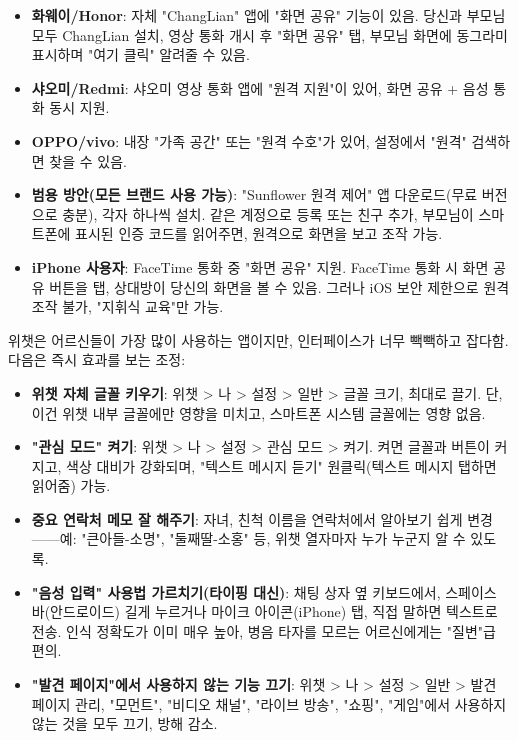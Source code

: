 \begin{itemize}
  \item \textbf{화웨이/Honor}: 자체 "ChangLian" 앱에 "화면 공유" 기능이 있음. 당신과 부모님 모두 ChangLian 설치, 영상 통화 개시 후 "화면 공유" 탭, 부모님 화면에 동그라미 표시하며 "여기 클릭" 알려줄 수 있음.
  \item \textbf{샤오미/Redmi}: 샤오미 영상 통화 앱에 "원격 지원"이 있어, 화면 공유 + 음성 통화 동시 지원.
  \item \textbf{OPPO/vivo}: 내장 "가족 공간" 또는 "원격 수호"가 있어, 설정에서 "원격" 검색하면 찾을 수 있음.
  \item \textbf{범용 방안(모든 브랜드 사용 가능)}: "Sunflower 원격 제어" 앱 다운로드(무료 버전으로 충분), 각자 하나씩 설치. 같은 계정으로 등록 또는 친구 추가, 부모님이 스마트폰에 표시된 인증 코드를 읽어주면, 원격으로 화면을 보고 조작 가능.
  \item \textbf{iPhone 사용자}: FaceTime 통화 중 "화면 공유" 지원. FaceTime 통화 시 화면 공유 버튼을 탭, 상대방이 당신의 화면을 볼 수 있음. 그러나 iOS 보안 제한으로 원격 조작 불가, "지휘식 교육"만 가능.
\end{itemize}


위챗은 어르신들이 가장 많이 사용하는 앱이지만, 인터페이스가 너무 빽빽하고 잡다함. 다음은 즉시 효과를 보는 조정:

\begin{itemize}
  \item \textbf{위챗 자체 글꼴 키우기}: 위챗 > 나 > 설정 > 일반 > 글꼴 크기, 최대로 끌기. 단, 이건 위챗 내부 글꼴에만 영향을 미치고, 스마트폰 시스템 글꼴에는 영향 없음.
  \item \textbf{"관심 모드" 켜기}: 위챗 > 나 > 설정 > 관심 모드 > 켜기. 켜면 글꼴과 버튼이 커지고, 색상 대비가 강화되며, "텍스트 메시지 듣기" 원클릭(텍스트 메시지 탭하면 읽어줌) 가능.
  \item \textbf{중요 연락처 메모 잘 해주기}: 자녀, 친척 이름을 연락처에서 알아보기 쉽게 변경——예: "큰아들-소명", "둘째딸-소홍" 등, 위챗 열자마자 누가 누군지 알 수 있도록.
  \item \textbf{"음성 입력" 사용법 가르치기(타이핑 대신)}: 채팅 상자 옆 키보드에서, 스페이스 바(안드로이드) 길게 누르거나 마이크 아이콘(iPhone) 탭, 직접 말하면 텍스트로 전송. 인식 정확도가 이미 매우 높아, 병음 타자를 모르는 어르신에게는 "질변"급 편의.
  \item \textbf{"발견 페이지"에서 사용하지 않는 기능 끄기}: 위챗 > 나 > 설정 > 일반 > 발견 페이지 관리, "모먼트", "비디오 채널", "라이브 방송", "쇼핑", "게임"에서 사용하지 않는 것을 모두 끄기, 방해 감소.
\end{itemize}

